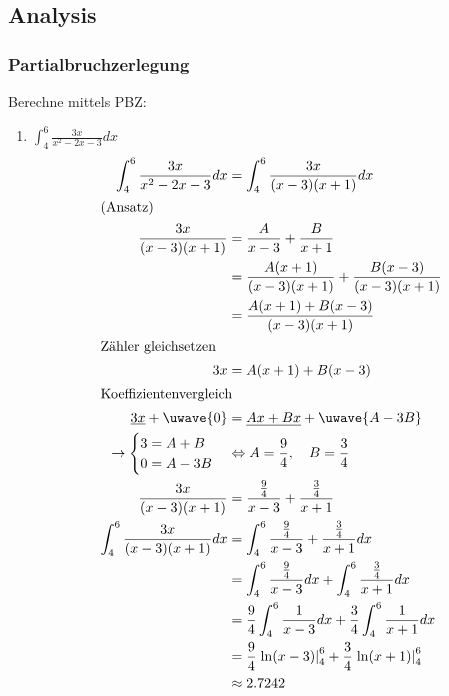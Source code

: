 \documentclass[11pt, a4paper]{article}
\begin{document}
\subsection{Analysis}
\subsubsection{Partialbruchzerlegung}
Berechne mittels PBZ:
\begin{enumerate}
	\item $\int_4^6 \frac{3x}{x^2 - 2x - 3} dx$ %
	\begin{align*}
		\int_4^6 \frac{3x}{x^2 - 2x - 3} dx &= \int_4^6 \frac{3x}{(x-3)(x+1)} dx \\
		\shortintertext{(Ansatz)}
		\frac{3x}{(x-3)(x+1)} &= \frac{A}{x-3} + \frac{B}{x+1} \\
		&= \frac{A (x+1)}{(x-3)(x+1)} + \frac{B (x-3)}{(x-3)(x+1)} \\
		&= \frac{A (x+1) + B (x-3)}{(x-3)(x+1)} \\
		\shortintertext{Zähler gleichsetzen}
		3x &= A (x+1) + B (x-3) \\
		\shortintertext{Koeffizientenvergleich}
		\underline{3x} + \uwave{0} &= \underline{Ax + Bx} + \uwave{A -3B} \\
		\rightarrow \begin{cases}
			3 = A + B \\
			0 = A - 3B
		\end{cases}
		&\Leftrightarrow A = \frac{9}{4}, \quad B = \frac{3}{4} \\
		\frac{3x}{(x-3)(x+1)} &= \frac{\frac{9}{4}}{x-3} + \frac{\frac{3}{4}}{x+1} \\
		\int_4^6 \frac{3x}{(x-3)(x+1)} dx &= \int_4^6 \frac{\frac{9}{4}}{x-3} + \frac{\frac{3}{4}}{x+1} dx \\
		&= \int_4^6 \frac{\frac{9}{4}}{x-3} dx + \int_4^6 \frac{\frac{3}{4}}{x+1} dx \\
		&= \frac{9}{4} \int_4^6 \frac{1}{x-3} dx + \frac{3}{4} \int_4^6 \frac{1}{x+1} dx \\
		&= \frac{9}{4} \left. \ln(x-3) \right|_4^6 + \frac{3}{4} \left. \ln(x+1) \right|_4^6 \\
		&\approx 2.7242
	\end{align*}
	

\end{enumerate}
\end{document}
